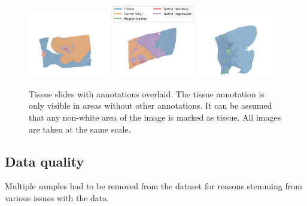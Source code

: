 \begin{figure}[h!t]
    \centering
    \includegraphics[width=0.32\textwidth]{latex/tissue/postproc_subimage_90-19_noLabel.png}
    \includegraphics[width=0.32\textwidth]{latex/tissue/postproc_subimage_109-42.png}
    \includegraphics[width=0.32\textwidth]{latex/tissue/postproc_subimage_19-42_noLabel.png}
    \caption[WSI and overlaid masks]{Tissue slides with annotations overlaid. The tissue annotation is only visible in areas without other annotations. It can be assumed that any non-white area of the image is marked as tissue. All images are taken at the same scale.}
    \label{fig:downsample_overlaid}
\end{figure}

\subsection{Data quality}

Multiple samples had to be removed from the dataset for reasons stemming from various issues with the data.

